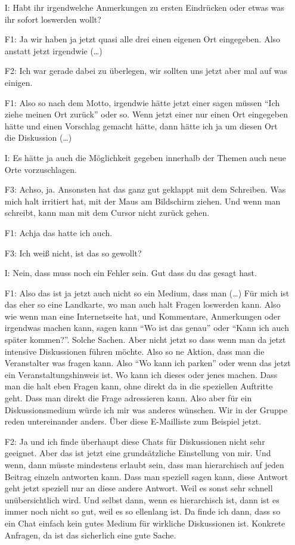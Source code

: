 \begin{itemize}
    \item[I:] Habt ihr irgendwelche Anmerkungen zu ersten Eindr{\"u}cken oder etwas was ihr sofort loswerden wollt?
    \item[F1:] Ja wir haben ja jetzt quasi alle drei einen eigenen Ort eingegeben. Also anstatt jetzt irgendwie (\dots)
    \item[F2:] Ich war gerade dabei zu {\"u}berlegen, wir sollten uns jetzt aber mal auf was einigen.
    \item[F1:] Also so nach dem Motto, irgendwie h{\"a}tte jetzt einer sagen m{\"u}ssen "`Ich ziehe meinen Ort zur{\"u}ck"' oder so. Wenn jetzt einer nur einen Ort eingegeben h{\"a}tte und einen Vorschlag gemacht h{\"a}tte, dann h{\"a}tte ich ja um diesen Ort die Diskussion (\dots)
    \item[I:] Es h{\"a}tte ja auch die M{\"o}glichkeit gegeben innerhalb der Themen auch neue Orte vorzuschlagen.
    \item[F3:] Achso, ja. Ansonsten hat das ganz gut geklappt mit dem Schreiben. Was mich halt irritiert hat, mit der Maus am Bildschirm ziehen. Und wenn man schreibt, kann man mit dem Cursor nicht zur{\"u}ck gehen.
    \item[F1:] Achja das hatte ich auch.
    \item[F3:] Ich wei{\ss} nicht, ist das so gewollt?
    \item[I:] Nein, dass muss noch ein Fehler sein. Gut dass du das gesagt hast.
    \item[F1:] Also das ist ja jetzt auch nicht so ein Medium, dass man (\dots) F{\"u}r mich ist das eher so eine Landkarte, wo man auch halt Fragen loswerden kann. Also wie wenn man eine Internetseite hat, und Kommentare, Anmerkungen oder irgendwas machen kann, sagen kann "`Wo ist das genau"' oder "`Kann ich auch sp{\"a}ter kommen?"'. Solche Sachen. Aber nicht jetzt so dass wenn man da jetzt intensive Diskussionen f{\"u}hren m{\"o}chte. Also so ne Aktion, dass man die Veranstalter was fragen kann. Also "`Wo kann ich parken"' oder wenn das jetzt ein Veranstaltungshinweis ist. Wo kann ich dieses oder jenes machen. Dass man die halt eben Fragen kann, ohne direkt da in die speziellen Auftritte geht. Dass man direkt die Frage adressieren kann. Also aber f{\"u}r ein Diskussionsmedium w{\"u}rde ich mir was anderes w{\"u}nschen. Wir in der Gruppe reden untereinander anders. {\"U}ber diese E-Mailliste zum Beispiel jetzt.
    \item[F2:] Ja und ich finde {\"u}berhaupt diese Chats f{\"u}r Diskussionen nicht sehr geeignet. Aber das ist jetzt eine grunds{\"a}tzliche Einstellung von mir. Und wenn, dann m{\"u}sste mindestens erlaubt sein, dass man hierarchisch auf jeden Beitrag einzeln antworten kann. Dass man speziell sagen kann, diese Antwort geht jetzt speziell nur an diese andere Antwort. Weil es sonst sehr schnell un{\"u}bersichtlich wird. Und selbst dann, wenn es hierarchisch ist, dann ist es immer noch nicht so gut, weil es so ellenlang ist. Da finde ich dann, dass so ein Chat einfach kein gutes Medium f{\"u}r wirkliche Diskussionen ist. Konkrete Anfragen, da ist das sicherlich eine gute Sache.

\end{itemize}
